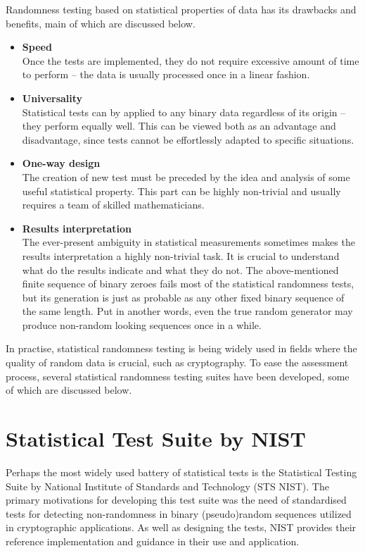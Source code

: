 \documentclass[12pt,oneside]{fithesis2}
\begin{document}
Randomness testing based on statistical properties of data has its drawbacks and benefits, main of which are discussed below.
\begin{itemize} \rightskip=2em
\item \textbf{Speed}\\
Once the tests are implemented, they do not require excessive amount of time to perform -- 
the data is usually processed once in a linear fashion.
\item \textbf{Universality}\\
Statistical tests can by applied to any binary data regardless of its origin -- they perform equally well. 
This can be viewed both as an advantage and disadvantage, since tests cannot be effortlessly adapted to specific situations.
\item \textbf{One-way design}\\
The creation of new test must be preceded by the idea and analysis of some useful statistical property. This part can be highly 
non-trivial and usually requires a team of skilled mathematicians.
\item \textbf{Results interpretation}\\
The ever-present ambiguity in statistical measurements sometimes makes the results interpretation a highly non-trivial task.
It is crucial to understand what do the results indicate and what they do not. The above-mentioned finite sequence of binary zeroes
fails most of the statistical randomness tests, but its generation is just as probable 
as any other fixed binary sequence of the same length.
Put in another words, even the true random generator may produce non-random looking sequences once in a while.
\end{itemize}

\noindent
In practise, statistical randomness testing is being widely used in fields where the quality of random data is crucial, 
such as cryptography. To ease the assessment process, several statistical randomness testing suites have been developed, 
some of which are discussed below.

\section{Statistical Test Suite by NIST}
\label{sec:sts-nist}

Perhaps the most widely used battery of statistical tests is the Statistical Testing Suite 
by National Institute of Standards and Technology (STS NIST).
The primary motivations for developing this test suite was the need of standardised tests for detecting non-randomness 
in binary (pseudo)random sequences utilized in cryptographic applications. As well as designing the tests,
NIST provides their reference implementation and guidance in their use and application. \cite{web NIST}
\end{document}
